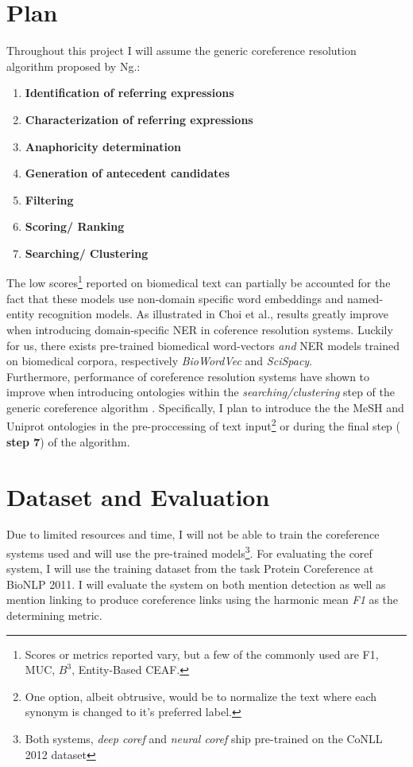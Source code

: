 \documentclass[11pt]{article}
\begin{document}
\section{Plan}
Throughout this project I will assume the generic coreference resolution algorithm \cite{ng_2003} proposed by Ng.: 
\begin{enumerate}
\item \textbf{Identification of referring expressions}
\item \textbf{Characterization of referring expressions}
\item \textbf{Anaphoricity determination}
\item \textbf{Generation of antecedent candidates}
\item \textbf{Filtering}
\item \textbf{Scoring/ Ranking}
\item \textbf{Searching/ Clustering}
\end{enumerate}

The low scores\footnote{Scores or metrics reported vary, but a few of the commonly used are F1, MUC, $B^3$, Entity-Based CEAF. } reported on biomedical text \cite{choi-etal-2014-analysis} can partially be accounted for the fact that these models use non-domain specific word embeddings and named-entity recognition models. As illustrated in Choi et al., results greatly improve when introducing domain-specific NER in coference resolution systems. Luckily for us, there exists pre-trained biomedical word-vectors \emph{and} NER models trained on biomedical corpora, respectively \emph{BioWordVec} and \emph{SciSpacy}.  \\

Furthermore, performance of coreference resolution systems have shown to improve when introducing ontologies within the \emph{searching/clustering} step of the generic coreference algorithm \cite{Prokofyev:2015:SOC:2942298.2942337}. Specifically, I plan to introduce the the MeSH and Uniprot ontologies in the pre-proccessing of text input\footnote{One option, albeit obtrusive, would be to normalize the text where each synonym is changed to it's preferred label.} or during the final step ( \textbf{step 7}) of the  algorithm.  

\section{Dataset and Evaluation}
Due to limited resources and time, I will not be able to train the coreference systems used and will use the pre-trained models\footnote{Both systems, \emph{deep coref} and \emph{neural coref} ship pre-trained on the CoNLL 2012 dataset}. For evaluating the  coref system, I will use the training dataset from the task Protein Coreference at BioNLP 2011. I will evaluate the system on both mention detection as well as mention linking to produce coreference links using the harmonic mean \emph{F1} as the determining metric. 
\end{document}

